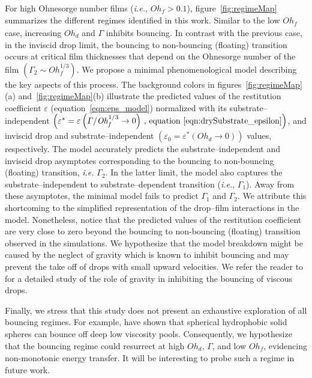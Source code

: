 \documentclass[]{jfm}
\newcommand{\Ohd}{\mathit{Oh}_\mathit{d}}
\newcommand{\Ohf}{\mathit{Oh}_\mathit{f}}
\begin{document}
For high Ohnesorge number films ({\it i.e.}, $\Ohf > 0.1$), figure~\ref{fig:regimeMap} summarizes the different regimes identified in this work. Similar to the low $\Ohf$ case, increasing $\Ohd$ and $\Gamma$ inhibits bouncing. In contrast with the previous case, in the inviscid drop limit, the bouncing to non-bouncing (floating) transition occurs at critical film thicknesses that depend on the Ohnesorge number of the film $\left(\Gamma_2 \sim \Ohf^{1/3}\right)$. We propose a minimal phenomenological model describing the key aspects of this process. The background colors in figures~\ref{fig:regimeMap}(a) and~\ref{fig:regimeMap}(b) illustrate the predicted values of the restitution coefficient $\varepsilon$ (equation~\eqref{eqn:eps_model}) normalized with its substrate--independent $\left(\varepsilon^* = \varepsilon\left(\Gamma/\Ohf^{1/3} \to 0\right)\,\text{, equation~\eqref{eqn:drySubstrate_epsilon}}\right)$, and inviscid drop and substrate--independent $\left(\varepsilon_0 = \varepsilon^*\left(\Ohd \to 0\right)\right)$ values, respectively. 
The model accurately predicts the substrate--independent and inviscid drop asymptotes corresponding to the bouncing to non-bouncing (floating) transition, {\it i.e.} $\Gamma_2$.
In the latter limit, the model also captures the substrate--independent to substrate--dependent transition ({\it i.e.}, $\Gamma_1$). Away from these asymptotes, the minimal model fails to predict $\Gamma_1$ and $\Gamma_2$. We attribute this shortcoming to the simplified representation of the drop--film interactions in the model. Nonetheless, notice that the predicted values of the restitution coefficient are very close to zero beyond the bouncing to non-bouncing (floating) transition observed in the simulations. We hypothesize that the model breakdown might be caused by the neglect of gravity which is known to inhibit bouncing \citep{biance2006} and may prevent the take off of drops with small upward velocities. We refer the reader to \citet{vatsalInProgress} for a detailed study of the role of gravity in inhibiting the bouncing of viscous drops.

Finally, we stress that this study does not present an exhaustive exploration of all bouncing regimes. For example, \citet{lee2008impact, galeano2021capillary} have shown that spherical hydrophobic solid spheres can bounce off deep low viscosity pools. Consequently, we hypothesize that the bouncing regime could resurrect at high $\Ohd$, $\Gamma$, and low $\Ohf$, evidencing non-monotonic energy transfer. It will be interesting to probe such a regime in future work. \\
\end{document}
